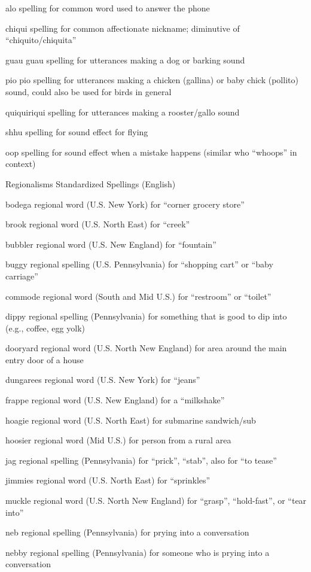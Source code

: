 \documentclass[
]{book}
\begin{document}
alo
spelling for common word used to answer the phone

chiqui
spelling for common affectionate nickname; diminutive of ``chiquito/chiquita''

guau guau
spelling for utterances making a dog or barking sound

pio pio
spelling for utterances making a chicken (gallina) or baby chick (pollito) sound, could also be used for birds in general

quiquiriqui
spelling for utterances making a rooster/gallo sound

shhu
spelling for sound effect for flying

oop
spelling for sound effect when a mistake happens (similar who ``whoops'' in context)

Regionalisms Standardized Spellings (English)

bodega
regional word (U.S. New York) for ``corner grocery store''

brook
regional word (U.S. North East) for ``creek''

bubbler
regional word (U.S. New England) for ``fountain''

buggy
regional spelling (U.S. Pennsylvania) for ``shopping cart'' or ``baby carriage''

commode
regional word (South and Mid U.S.) for ``restroom'' or ``toilet''

dippy
regional spelling (Pennsylvania) for something that is good to dip into (e.g., coffee, egg yolk)

dooryard
regional word (U.S. North New England) for area around the main entry door of a house

dungarees
regional word (U.S. New York) for ``jeans''

frappe
regional word (U.S. New England) for a ``milkshake''

hoagie
regional word (U.S. North East) for submarine sandwich/sub

hoosier
regional word (Mid U.S.) for person from a rural area

jag
regional spelling (Pennsylvania) for ``prick'', ``stab'', also for ``to tease''

jimmies
regional word (U.S. North East) for ``sprinkles''

muckle
regional word (U.S. North New England) for ``grasp'', ``hold-fast'', or ``tear into''

neb
regional spelling (Pennsylvania) for prying into a conversation

nebby
regional spelling (Pennsylvania) for someone who is prying into a conversation
\end{document}
